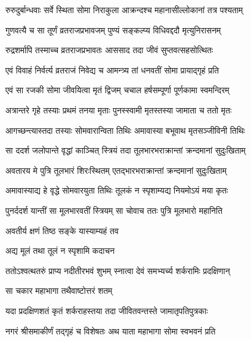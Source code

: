 \twolineshloka
{रुरुदुर्बान्धवाः सर्वे स्थिता सोमा निराकुला}
{आक्रन्दश्च महानासील्लोकानां तत्र पश्यताम्} %

\twolineshloka
{गुणवत्यै च सा तूर्णं व्रतराजप्रभावजम्}
{पुण्यं सङ्कल्प्य विधिवद्ददौ मृत्युनिरासनम्} %

\twolineshloka
{रुद्रशर्मापि तस्माच्च व्रतराजप्रभावतः}
{आससाद तदा जीवं सुप्तवत्सहसोत्थितः} %

\twolineshloka
{एवं विवाहं निर्वर्त्य व्रतराजं निवेद्य च}
{आमन्त्र्य तां धनवतीं सोमा प्रायाद्गृहं प्रति} %

\twolineshloka
{एवं सा रजकी सोमा जीवयित्वा मृतं द्विजम्}
{चचाल हर्षसम्पूर्णा पूर्णकामा स्वमन्दिरम्} %

\twolineshloka
{अत्रान्तरे गृहे तस्याः प्रथमं तनया मृताः}
{पुनस्स्वामी मृतस्तस्या जामाता च ततो मृतः} %

\twolineshloka
{आगच्छन्त्यास्तदा तस्याः सोमवारान्विता तिथिः}
{अमावास्या बभूवाथ मृतसञ्जीविनी तिथिः} %

\twolineshloka
{सा ददर्श जलोपान्ते वृद्धां काञ्चित् स्त्रियं तदा}
{तूलभारभराक्रान्तां क्रन्दमानां सुदुःखिताम्} %


\twolineshloka
{अवतारय मे पुत्रि तूलभारं शिरःस्थितम्}
{एतद्भारभराक्रान्तां क्रन्दमानां सुदुःखिताम्} %


\twolineshloka
{अमावास्याद्य हे वृद्धे सोमवारयुता तिथिः}
{तूलकं न स्पृशाम्यद्य नियमोऽयं मया कृतः} %

\twolineshloka
{पुनर्ददर्श यान्तीं सा मूलभारवतीं स्त्रियम्}
{सा चोवाच ततः पुत्रि मूलभारो महानिति} %


\onelineshloka
{अवतीर्य क्षणं तिष्ठ सङ्के यास्याम्यहं तव} %


\onelineshloka
{अद्य मूलं तथा तूलं न स्पृशामि कदाचन} %

\twolineshloka
{ततोऽश्वत्थतरुं प्राप्य नदीतीरभवं शुभम्}
{स्नात्वा देवं समभ्यर्च्य शर्करामिः प्रदक्षिणान्} %

\onelineshloka
{सा चकार महाभागा तथैवाष्टोत्तरं शतम्} %


\twolineshloka
{यदा प्रदक्षिणशतं कृतं शर्कराहस्तया}
{तदा जीवितवन्तस्ते जामातृपतिपुत्रकाः} %

\twolineshloka
{नगरं श्रीसमाकीर्णं तद्गृहं च विशेषतः}
{अथ याता महाभागा सोमा स्वभवनं प्रति} %

